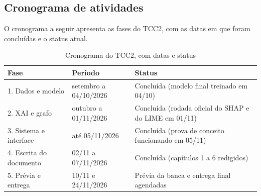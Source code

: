 \documentclass[
    12pt,                %
    openright,           %
    oneside,             %
    a4paper,             %
    english,             %
    brazil               %
]{abntex2}
\begin{document}


\begin{apendicesenv}
\partapendices

\chapter{Cronograma de atividades}
\label{ap:cronograma}

O cronograma a seguir apresenta as fases do TCC2, com as datas em que foram concluídas e o status atual.

\begin{table}[htb]
  \centering
  \caption{Cronograma do TCC2, com datas e status}
  \label{tab:cronograma}
  \small
  \begin{tabular}{p{4.2cm}p{4.6cm}p{3.6cm}}
    \toprule
    Fase & Período & Status \\
    \midrule
    1. Dados e modelo & setembro a 04/10/2026 & Concluída (modelo final treinado em 04/10) \\
    2. XAI e grafo & outubro a 01/11/2026 & Concluída (rodada oficial do SHAP e do LIME em 01/11) \\
    3. Sistema e interface & até 05/11/2026 & Concluída (prova de conceito funcionando em 05/11) \\
    4. Escrita do documento & 02/11 a 07/11/2026 & Concluída (capítulos 1 a 6 redigidos) \\
    5. Prévia e entrega & 10/11 e 24/11/2026 & Prévia da banca e entrega final agendadas \\
    \bottomrule
  \end{tabular}
\end{table}

\end{apendicesenv}
\end{document}
